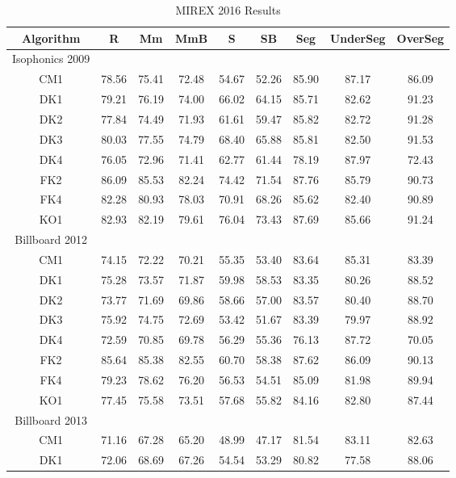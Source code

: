 \begin{table*}[htb]
\centering
\scriptsize
\caption{MIREX 2016 Results}
\label{tab:3-mirex2016}
\begin{tabular}{|c|c|c|c|c|c|c|c|c|}\hline
Algorithm & R & Mm & MmB & S & SB & Seg & UnderSeg & OverSeg \\ \hline
Isophonics 2009\\ \hline
CM1 & 78.56 & 75.41 & 72.48 & 54.67 & 52.26 & 85.90 & 87.17 & 86.09\\ \hline
DK1 & 79.21 & 76.19 & 74.00 & 66.02 & 64.15 & 85.71 & 82.62 & 91.23\\ \hline
DK2 & 77.84 & 74.49 & 71.93 & 61.61 & 59.47 & 85.82 & 82.72 & 91.28\\ \hline
DK3 & 80.03 & 77.55 & 74.79 & 68.40 & 65.88 & 85.81 & 82.50 & 91.53\\ \hline
DK4 & 76.05 & 72.96 & 71.41 & 62.77 & 61.44 & 78.19 & 87.97 & 72.43\\ \hline
FK2 & 86.09 & 85.53 & 82.24 & 74.42 & 71.54 & 87.76 & 85.79 & 90.73\\ \hline
FK4 & 82.28 & 80.93 & 78.03 & 70.91 & 68.26 & 85.62 & 82.40 & 90.89\\ \hline
KO1 & 82.93 & 82.19 & 79.61 & 76.04 & 73.43 & 87.69 & 85.66 & 91.24\\ \hline
Billboard 2012 \\ \hline
CM1 & 74.15 & 72.22 & 70.21 & 55.35 & 53.40 & 83.64 & 85.31 & 83.39\\ \hline
DK1 & 75.28 & 73.57 & 71.87 & 59.98 & 58.53 & 83.35 & 80.26 & 88.52\\ \hline
DK2 & 73.77 & 71.69 & 69.86 & 58.66 & 57.00 & 83.57 & 80.40 & 88.70\\ \hline
DK3 & 75.92 & 74.75 & 72.69 & 53.42 & 51.67 & 83.39 & 79.97 & 88.92\\ \hline
DK4 & 72.59 & 70.85 & 69.78 & 56.29 & 55.36 & 76.13 & 87.72 & 70.05\\ \hline
FK2 & 85.64 & 85.38 & 82.55 & 60.70 & 58.38 & 87.62 & 86.09 & 90.13\\ \hline
FK4 & 79.23 & 78.62 & 76.20 & 56.53 & 54.51 & 85.09 & 81.98 & 89.94\\ \hline
KO1 & 77.45 & 75.58 & 73.51 & 57.68 & 55.82 & 84.16 & 82.80 & 87.44\\ \hline
Billboard 2013 \\ \hline
CM1 & 71.16 & 67.28 & 65.20 & 48.99 & 47.17 & 81.54 & 83.11 & 82.63\\ \hline
DK1 & 72.06 & 68.69 & 67.26 & 54.54 & 53.29 & 80.82 & 77.58 & 88.06\\ \hline

\end{tabular}
\end{table*}

